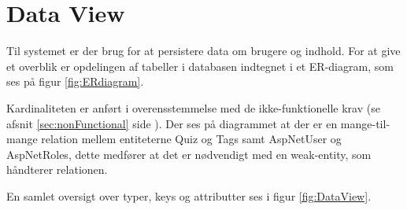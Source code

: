 \section{Data View}

Til systemet er der brug for at persistere data om brugere og indhold. For at give et overblik er opdelingen af tabeller i databasen indtegnet i et ER-diagram, som ses på figur \ref{fig:ERdiagram}.


Kardinaliteten er anført i overensstemmelse med de ikke-funktionelle krav (se afsnit \ref{sec:nonFunctional} side \pageref{sec:nonFunctional}).
Der ses på diagrammet at der er en mange-til-mange relation mellem  entiteterne Quiz og Tags samt AspNetUser og AspNetRoles, dette medfører at det er nødvendigt med en weak-entity, som håndterer relationen.


En samlet oversigt over typer, keys og attributter ses i figur \ref{fig:DataView}.


